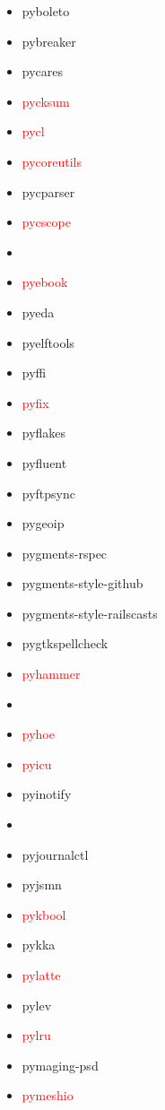 \documentclass{l4proj}
\begin{document}
\begin{appendices}
{}%
\noindent\parbox[t]{0.32\textwidth}{\raggedright%
\begin{itemize}
\item pyboleto
\item pybreaker
\item pycares
\item\textcolor{red}{pycksum}
\item\textcolor{red}{pycl}
\item\textcolor{red}{pycoreutils}
\item pycparser
\item\textcolor{red}{pycscope}
\item {}
\item\textcolor{red}{pyebook}
\item pyeda
\item pyelftools
\item pyffi
\item\textcolor{red}{pyfix}
\item pyflakes
\item pyfluent
\item pyftpsync
\item pygeoip
\item pygments-rspec
\item pygments-style-github
\item pygments-style-railscasts
\item pygtkspellcheck
\item\textcolor{red}{pyhammer}
\item\textcolor{red}{}
\item\textcolor{red}{pyhoe}
\item\textcolor{red}{pyicu}
\item pyinotify
\item\textcolor{red}{}
\item pyjournalctl
\item pyjsmn
\end{itemize}
}%
\clearpage
\noindent\parbox[t]{0.32\textwidth}{\raggedright%
\begin{itemize}
\item\textcolor{red}{pykbool}
\item pykka
\item\textcolor{red}{pylatte}
\item pylev
\item\textcolor{red}{pylru}
\item pymaging-psd
\item\textcolor{red}{pymeshio}

\end{itemize}}
\end{appendices}
\end{document}
